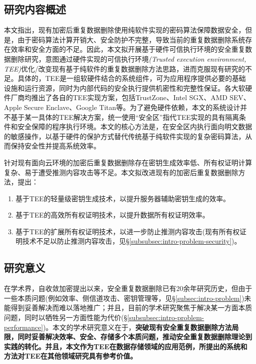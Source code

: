 \subsection{研究内容概述}
\label{subsec:intro-content}

本文指出，现有加密后重复数据删除使用纯软件实现的密码算法保障数据安全，但是，由于密码算法计算开销大、安全防护不完整，导致当前的重复数据删除系统存在效率和安全方面的不足。因此，本文拟开展基于硬件可信执行环境的安全重复数据删除研究，意图通过硬件实现的可信执行环境\textit{(Trusted execution environment, TEE)}优化/改变现有基于纯软件的重复数据删除方法思路，进而克服现有研究的不足。具体的，TEE是一组软硬件结合的系统组件，可为应用程序提供必要的基础设施和运行资源，同时为内部代码的安全执行提供机密性和完整性保证\cite{OMTP}。各大软硬件厂商均推出了各自的TEE实现方案，包括TrustZone\cite{trustzone}、Intel SGX\cite{sgx,sgx2}、AMD SEV\cite{AMDSEV}、Apple Secure Enclave\cite{AppleSecureEnclave}、Google Titan\cite{GoogleTitan}等。为了避免硬件依赖，本文的系统设计并不基于某一具体的TEE解决方案，统一使用“安全区”指代TEE实现的具有隔离条件和安全保障的程序执行环境。本文的核心方法是，在安全区内执行面向明文数据的敏感操作，以基于硬件的保护方式替代传统基于纯软件实现的复杂密码算法，从而保持安全性并提高系统效率。

针对现有面向云环境的加密后重复数据删除存在密钥生成效率低、所有权证明计算复杂、易于遭受推测内容攻击等不足。本文拟改进现有的加密后重复数据删除方法，提出：

\begin{enumerate}[leftmargin=0em]
    \item 基于TEE的轻量级密钥生成技术，以提升服务器辅助密钥生成的效率。
    \item 基于TEE的高效所有权证明技术，以提升数据所有权证明效率。
    \item 基于TEE的扩展所有权证明技术，以进一步防止推测内容攻击(现有所有权证明技术不足以防止推测内容攻击，见\S\ref{subsubsec:intro-problem-security})。
\end{enumerate}

\subsection{研究意义}
\label{subsec:intro-meaning}

在学术界，自收敛加密\cite{douceur2002reclaiming}提出以来，安全重复数据删除已有20余年研究历史，但由于一些本质问题(例如效率、侧信道攻击、密钥管理等，见\S\ref{subsec:intro-problem})未能得到妥善解决而难以落地推广；并且，目前的学术研究聚焦于解决某一方面本质问题，同时以牺牲另一方面性能为代价(\S\ref{subsubsec:intro-problem-performance})。本文的学术研究意义在于，\textbf{突破现有安全重复数据删除方法局限，同时妥善解决效率、安全、存储多个本质问题，推动安全重复数据删除理论到实践的转化。并且，本文作为TEE在数据存储领域的应用范例，所提出的系统和方法对TEE在其他领域研究具有参考价值。}


